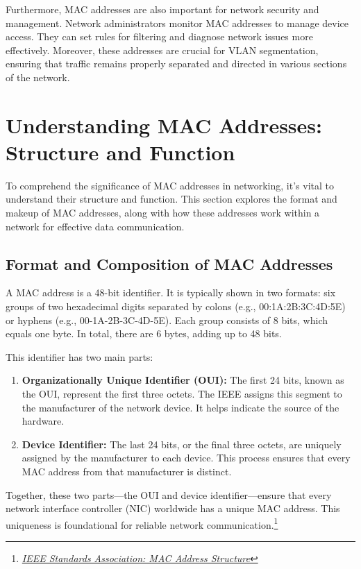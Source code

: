 \documentclass[11pt,a4paper]{article}
\begin{document}
Furthermore, MAC addresses are also important for network security and management. Network administrators monitor MAC addresses to manage device access. They can set rules for filtering and diagnose network issues more effectively. Moreover, these addresses are crucial for VLAN segmentation, ensuring that traffic remains properly separated and directed in various sections of the network.


\section*{Understanding MAC Addresses: Structure and Function}
To comprehend the significance of MAC addresses in networking, it’s vital to understand their structure and function. This section explores the format and makeup of MAC addresses, along with how these addresses work within a network for effective data communication.


\subsection*{Format and Composition of MAC Addresses}

A MAC address is a 48-bit identifier. It is typically shown in two formats: six groups of two hexadecimal digits separated by colons (e.g., 00:1A:2B:3C:4D:5E) or hyphens (e.g., 00-1A-2B-3C-4D-5E). Each group consists of 8 bits, which equals one byte. In total, there are 6 bytes, adding up to 48 bits.

This identifier has two main parts:

\begin{enumerate}
    
    \item \textbf{Organizationally Unique Identifier (OUI):} The first 24 bits, known as the OUI, represent the first three octets. The IEEE assigns this segment to the manufacturer of the network device. It helps indicate the source of the hardware.

    \item \textbf{Device Identifier:} The last 24 bits, or the final three octets, are uniquely assigned by the manufacturer to each device. This process ensures that every MAC address from that manufacturer is distinct.

\end{enumerate}


Together, these two parts—the OUI and device identifier—ensure that every network interface controller (NIC) worldwide has a unique MAC address. This uniqueness is foundational for reliable network communication.\footnote{\href{https://standards.ieee.org/products-programs/regauth/mac.html}{\textit{IEEE Standards Association: MAC Address Structure}}}
\end{document}
